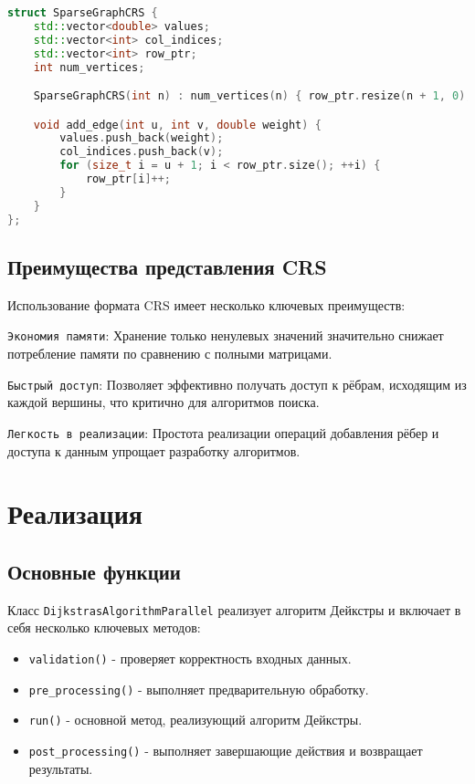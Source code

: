 \documentclass[12pt]{article}
\begin{document}
\begin{lstlisting}[language=c++, caption={Определение структуры SparseGraphCRS}]
struct SparseGraphCRS {
    std::vector<double> values;
    std::vector<int> col_indices;
    std::vector<int> row_ptr;
    int num_vertices;

    SparseGraphCRS(int n) : num_vertices(n) { row_ptr.resize(n + 1, 0); }

    void add_edge(int u, int v, double weight) {
        values.push_back(weight);
        col_indices.push_back(v);
        for (size_t i = u + 1; i < row_ptr.size(); ++i) {
            row_ptr[i]++;
        }
    }
};
\end{lstlisting}
\subsection{Преимущества представления CRS}
Использование формата CRS имеет несколько ключевых преимуществ:
\item \texttt{Экономия памяти}: Хранение только ненулевых значений значительно снижает потребление памяти по сравнению с полными матрицами.
\item \texttt{Быстрый доступ}: Позволяет эффективно получать доступ к рёбрам, исходящим из каждой вершины, что критично для алгоритмов поиска.
\item \texttt{Легкость в реализации}: Простота реализации операций добавления рёбер и доступа к данным упрощает разработку алгоритмов.
\newpage
\section{Реализация}
\subsection{Основные функции}
Класс \texttt{DijkstrasAlgorithmParallel} реализует алгоритм Дейкстры и включает в себя несколько ключевых методов:
\begin{itemize}
    \item \texttt{validation()} - проверяет корректность входных данных.
    \item \texttt{pre\_processing()} - выполняет предварительную обработку.
    \item \texttt{run()} - основной метод, реализующий алгоритм Дейкстры.
    \item \texttt{post\_processing()} - выполняет завершающие действия и возвращает результаты.
\end{itemize}
\end{document}

